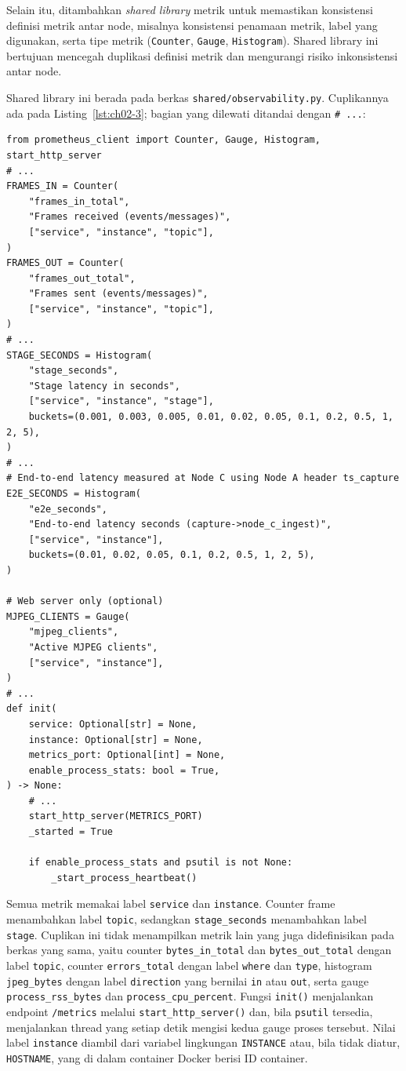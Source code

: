 \begin{enumerate}
Selain itu, ditambahkan \emph{shared library} metrik untuk memastikan konsistensi definisi metrik antar node, misalnya konsistensi penamaan metrik, label yang digunakan, serta tipe metrik (\texttt{Counter}, \texttt{Gauge}, \texttt{Histogram}). Shared library ini bertujuan mencegah duplikasi definisi metrik dan mengurangi risiko inkonsistensi antar node.

Shared library ini berada pada berkas \texttt{shared/observability.py}. Cuplikannya ada pada Listing~\ref{lst:ch02-3}; bagian yang dilewati ditandai dengan \texttt{\# ...}:

\begin{lstlisting}[style=PythonStyle, breakatwhitespace=true, caption={Cuplikan berkas shared/observability.py}, label={lst:ch02-3}]
from prometheus_client import Counter, Gauge, Histogram, start_http_server
# ...
FRAMES_IN = Counter(
    "frames_in_total",
    "Frames received (events/messages)",
    ["service", "instance", "topic"],
)
FRAMES_OUT = Counter(
    "frames_out_total",
    "Frames sent (events/messages)",
    ["service", "instance", "topic"],
)
# ...
STAGE_SECONDS = Histogram(
    "stage_seconds",
    "Stage latency in seconds",
    ["service", "instance", "stage"],
    buckets=(0.001, 0.003, 0.005, 0.01, 0.02, 0.05, 0.1, 0.2, 0.5, 1, 2, 5),
)
# ...
# End-to-end latency measured at Node C using Node A header ts_capture
E2E_SECONDS = Histogram(
    "e2e_seconds",
    "End-to-end latency seconds (capture->node_c_ingest)",
    ["service", "instance"],
    buckets=(0.01, 0.02, 0.05, 0.1, 0.2, 0.5, 1, 2, 5),
)

# Web server only (optional)
MJPEG_CLIENTS = Gauge(
    "mjpeg_clients",
    "Active MJPEG clients",
    ["service", "instance"],
)
# ...
def init(
    service: Optional[str] = None,
    instance: Optional[str] = None,
    metrics_port: Optional[int] = None,
    enable_process_stats: bool = True,
) -> None:
    # ...
    start_http_server(METRICS_PORT)
    _started = True

    if enable_process_stats and psutil is not None:
        _start_process_heartbeat()
\end{lstlisting}

Semua metrik memakai label \texttt{service} dan \texttt{instance}. Counter frame menambahkan label \texttt{topic}, sedangkan \texttt{stage\_seconds} menambahkan label \texttt{stage}. Cuplikan ini tidak menampilkan metrik lain yang juga didefinisikan pada berkas yang sama, yaitu counter \texttt{bytes\_in\_total} dan \texttt{bytes\_out\_total} dengan label \texttt{topic}, counter \texttt{errors\_total} dengan label \texttt{where} dan \texttt{type}, histogram \texttt{jpeg\_bytes} dengan label \texttt{direction} yang bernilai \texttt{in} atau \texttt{out}, serta gauge \texttt{process\_rss\_bytes} dan \texttt{process\_cpu\_percent}. Fungsi \texttt{init()} menjalankan endpoint \texttt{/metrics} melalui \texttt{start\_http\_server()} dan, bila \texttt{psutil} tersedia, menjalankan thread yang setiap detik mengisi kedua gauge proses tersebut. Nilai label \texttt{instance} diambil dari variabel lingkungan \texttt{INSTANCE} atau, bila tidak diatur, \texttt{HOSTNAME}, yang di dalam container Docker berisi ID container.


\end{enumerate}
